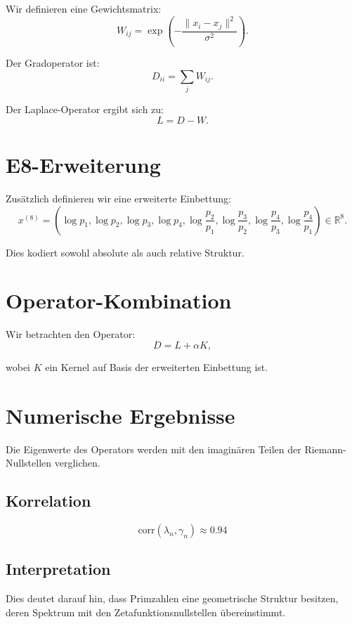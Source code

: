 \documentclass[11pt,a4paper]{article}
\begin{document}
	Wir definieren eine Gewichtsmatrix:
	\[
	W_{ij} = \exp\left(-\frac{\|x_i - x_j\|^2}{\sigma^2}\right).
	\]
	
	Der Gradoperator ist:
	\[
	D_{ii} = \sum_j W_{ij}.
	\]
	
	Der Laplace-Operator ergibt sich zu:
	\[
	L = D - W.
	\]
	
	\section{E8-Erweiterung}
	
	Zusätzlich definieren wir eine erweiterte Einbettung:
	\[
	x^{(8)} =
	(\log p_1,\log p_2,\log p_3,\log p_4,
	\log\frac{p_2}{p_1},\log\frac{p_3}{p_2},
	\log\frac{p_4}{p_3},\log\frac{p_4}{p_1})
	\in \mathbb{R}^8.
	\]
	
	Dies kodiert sowohl absolute als auch relative Struktur.
	
	\section{Operator-Kombination}
	
	Wir betrachten den Operator:
	\[
	D = L + \alpha K,
	\]
	
	wobei $K$ ein Kernel auf Basis der erweiterten Einbettung ist.
	
	\section{Numerische Ergebnisse}
	
	Die Eigenwerte des Operators werden mit den imaginären Teilen
	der Riemann-Nullstellen verglichen.
	
	\subsection{Korrelation}
	
	\[
	\text{corr}(\lambda_n,\gamma_n) \approx 0.94
	\]
	
	\subsection{Interpretation}
	
	Dies deutet darauf hin, dass Primzahlen eine
	geometrische Struktur besitzen, deren Spektrum mit den
	Zetafunktionsnullstellen übereinstimmt.
	
\end{document}

